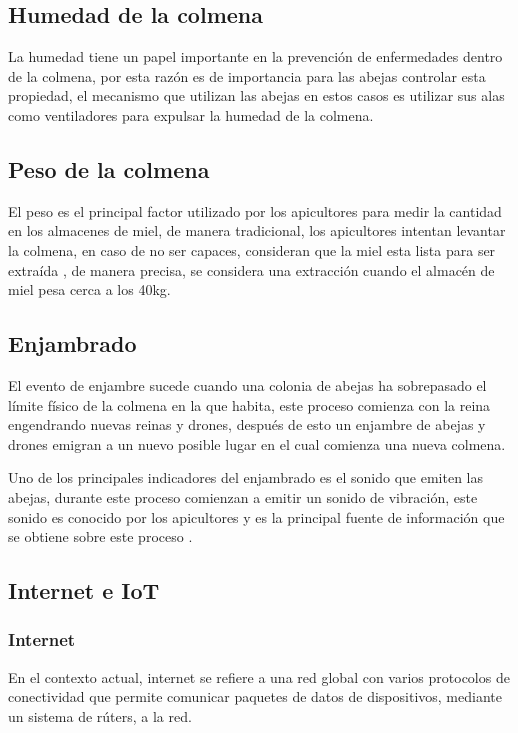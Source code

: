 \subsection{Humedad de la colmena}
La humedad tiene un papel importante en la prevención de enfermedades dentro de la colmena, por esta razón es de importancia para las abejas controlar esta propiedad, el mecanismo que utilizan las abejas en estos casos es utilizar sus alas como ventiladores para expulsar la humedad de la colmena. \cite{chadwick_alton_tennant_fitzmaurice_earl_2016}

\subsection{Peso de la colmena}
El peso es el principal factor utilizado por los apicultores para medir la cantidad en los almacenes de miel, de manera tradicional, los apicultores intentan levantar la colmena, en caso de no ser capaces, consideran que la miel esta lista para ser extraída \cite{chadwick_alton_tennant_fitzmaurice_earl_2016}, de manera precisa, se considera una extracción cuando el almacén de miel pesa cerca a los 40kg.\cite{david_cramp}

\subsection{Enjambrado}
El evento de enjambre sucede cuando una colonia de abejas ha sobrepasado el límite físico de la colmena en la que habita, este proceso comienza con la reina engendrando nuevas reinas y drones, después de esto un enjambre de abejas y drones emigran a un nuevo posible lugar en el cual comienza una nueva colmena. \cite{chadwick_alton_tennant_fitzmaurice_earl_2016}

Uno de los principales indicadores del enjambrado es el sonido que emiten las abejas, durante este proceso comienzan a emitir un sonido de vibración, este sonido es conocido por los apicultores y es la principal fuente de información que se obtiene sobre este proceso \cite{david_cramp} \cite{chadwick_alton_tennant_fitzmaurice_earl_2016}.

\subsection{Internet e IoT}

\subsubsection{Internet}
En el contexto actual, internet se refiere a una red global con varios protocolos de conectividad que permite comunicar paquetes de datos de dispositivos, mediante un sistema de rúters, a la red. \cite{kamal_2017}

